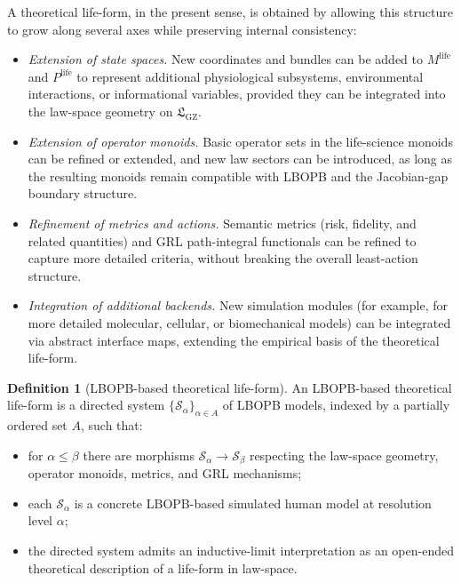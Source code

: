 \documentclass[11pt]{book}
\theoremstyle{plain}
\theoremstyle{definition}
\newtheorem{definition}[theorem]{Definition}
\theoremstyle{remark}
\newcommand{\GZLS}{\ensuremath{\mathfrak{L}_{\mathrm{GZ}}}}       \newcommand{\GZLT}{\ensuremath{M_{!w}}}                           \newcommand{\GZLOC}{\ensuremath{A_M}}                             \newcommand{\GZLCurv}{\ensuremath{\mathcal{F}_{\mathrm{law}}}}
\begin{document}
A theoretical life-form, in the present sense, is obtained by allowing
this structure to grow along several axes while preserving internal
consistency:

\begin{itemize}
  \item \emph{Extension of state spaces.}
        New coordinates and bundles can be added to $M^{\mathrm{life}}$
        and $P^{\mathrm{life}}$ to represent additional physiological
        subsystems, environmental interactions, or informational
        variables, provided they can be integrated into the law-space
        geometry on $\GZLS$.
  \item \emph{Extension of operator monoids.}
        Basic operator sets in the life-science monoids can be refined
        or extended, and new law sectors can be introduced, as long as
        the resulting monoids remain compatible with LBOPB and the
        Jacobian-gap boundary structure.
  \item \emph{Refinement of metrics and actions.}
        Semantic metrics (risk, fidelity, and related quantities) and
        GRL path-integral functionals can be refined to capture more
        detailed criteria, without breaking the overall least-action
        structure.
  \item \emph{Integration of additional backends.}
        New simulation modules (for example, for more detailed
        molecular, cellular, or biomechanical models) can be integrated
        via abstract interface maps, extending the empirical basis of
        the theoretical life-form.
\end{itemize}

\begin{definition}[LBOPB-based theoretical life-form]
An LBOPB-based theoretical life-form is a directed system
$\{\mathcal{S}_{\alpha}\}_{\alpha \in A}$ of LBOPB models, indexed by
a partially ordered set $A$, such that:
\begin{itemize}
  \item for $\alpha \le \beta$ there are morphisms
        $\mathcal{S}_{\alpha} \to \mathcal{S}_{\beta}$ respecting the
        law-space geometry, operator monoids, metrics, and GRL
        mechanisms;
  \item each $\mathcal{S}_{\alpha}$ is a concrete LBOPB-based simulated
        human model at resolution level $\alpha$;
  \item the directed system admits an inductive-limit interpretation
        as an open-ended theoretical description of a life-form in
        law-space.
\end{itemize}
\end{definition}
\end{document}
